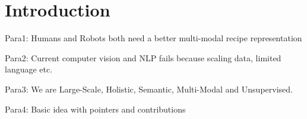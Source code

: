 \section{Introduction}
Para1: Humans and Robots both need a better multi-modal recipe representation


Para2: Current computer vision and NLP fails because scaling data, limited language etc.

Para3: We are Large-Scale, Holistic, Semantic, Multi-Modal and Unsupervised.

Para4: Basic idea with pointers and contributions
